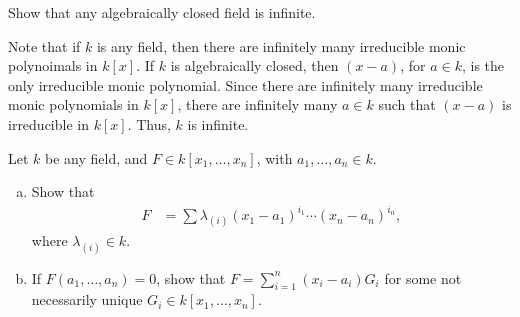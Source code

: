 \documentclass[10pt]{mypackage}
\begin{document}
\begin{exercise}[Exercise 1.6]
Show that any algebraically closed field is infinite.
\end{exercise}
\begin{solution}
  Note that if $k$ is any field, then there are infinitely many irreducible monic polynoimals in $k\left[x\right]$. If $k$ is algebraically closed, then $\left(x-a\right)$, for $a\in k$, is the only irreducible monic polynomial. Since there are infinitely many irreducible monic polynomials in $k\left[x\right]$, there are infinitely many $a\in k$ such that $\left(x-a\right)$ is irreducible in $k\left[x\right]$. Thus, $k$ is infinite.
\end{solution}

\begin{exercise}[Exercise 1.7]
Let $k$ be any field, and $F\in k\left[x_1,\dots,x_n\right]$, with $a_1,\dots,a_n\in k$.
\begin{enumerate}[(a)]
  \item Show that
    \begin{align*}
      F &= \sum\lambda_{(i)}\left(x_1-a_1\right)^{i_1}\cdots \left(x_n-a_n\right)^{i_n},
    \end{align*}
    where $\lambda_{(i)}\in k$.
  \item If $F\left(a_1,\dots,a_n\right) = 0$, show that $F = \sum_{i=1}^{n}\left(x_i - a_i\right)G_i$ for some not necessarily unique $G_i\in k\left[x_1,\dots,x_n\right]$.
\end{enumerate}
\end{exercise}
\end{document}
